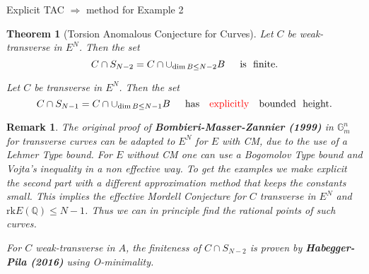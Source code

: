 \documentclass[12pt]{beamer}
\newtheorem{thm}{Theorem}
\newtheorem{remark}{Remark}
\begin{document}
\begin{frame}{Explicit TAC $\Rightarrow$ method for Example 2}

\pause
\begin{thm}[Torsion Anomalous Conjecture for Curves]

Let $C$ be weak-transverse in $E^N$. Then the set  $$C\cap S_{N-2}=C\cap \cup_{\dim B\le N- 2}B \,\,\,\,\,\,\,\,\,{\rm is\,\,\,\,finite}.$$

Let $C$ be transverse in $E^N$. Then the set  $$C\cap S_{N-1}=C\cap \cup_{\dim B\le N-1 }B \,\,\,\,\,\,\,\,\,{\rm has \quad \textcolor{red}{explicitly} \quad bounded\,\,\,\,height}.$$


\end{thm}
\pause
\begin{remark}
The original proof of {\bf  Bombieri-Masser-Zannier (1999)} in $\mathbb{G}_m^n$ for transverse curves can be adapted to $E^N$ for $E$ with CM, due to the use of a Lehmer Type bound.
For $E$ without CM one can use a Bogomolov Type bound and Vojta's inequality in a non effective way. 
To get the examples we make explicit the second part with a different approximation method that keeps the constants small. 
This implies  the effective Mordell Conjecture  for  $C$  transverse in $E^N$ and $\mathrm{rk} E(\mathbb{Q})\le N-1$. Thus we can in principle find the rational points of such curves. 

For $C$ weak-transverse in $A$, the finiteness of $C\cap S_{N-2}$ is proven by {\bf Habegger-Pila (2016)} using O-minimality.
\end{remark}

\end{frame}
\end{document}
